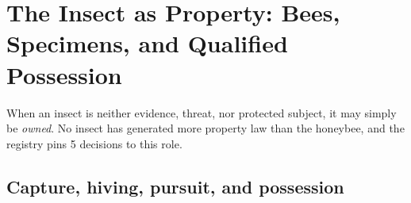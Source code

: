 \documentclass[
  english,
]{article}
\begin{document}
\newpage

\section{The Insect as Property: Bees, Specimens, and Qualified
Possession}\label{sec:property}

When an insect is neither evidence, threat, nor protected subject, it
may simply be \emph{owned}. No insect has generated more property law
than the honeybee, and the registry pins 5 decisions to this role.

\subsection{Capture, hiving, pursuit, and
possession}\label{capture-hiving-pursuit-and-possession}
\end{document}
